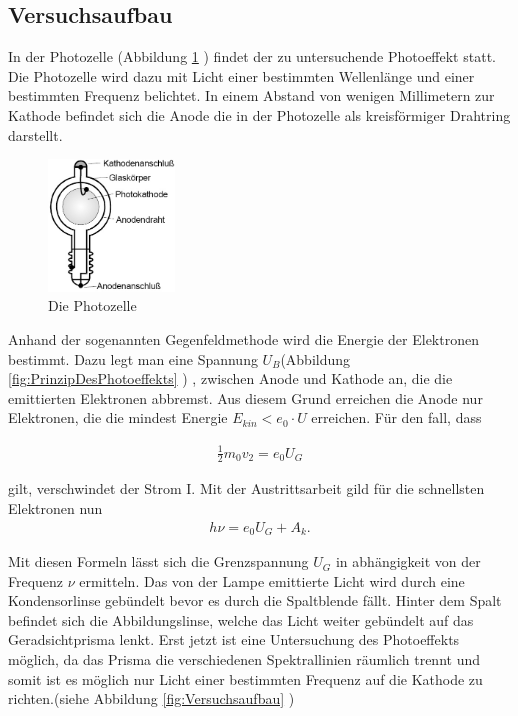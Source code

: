 %
%
\subsection{Versuchsaufbau}
In der Photozelle (Abbildung \ref{fig:Photozelle} ) findet der zu untersuchende Photoeffekt statt.
Die Photozelle wird dazu mit Licht einer bestimmten Wellenlänge und einer bestimmten
Frequenz belichtet. In einem Abstand von wenigen Millimetern zur Kathode befindet sich die Anode die in der Photozelle als kreisförmiger Drahtring darstellt.

\begin{figure}[h]
	\centering
		\includegraphics[width=0.30\textwidth]{Photozelle.jpg}
		\caption{Die Photozelle}
	\label{fig:Photozelle}
\end{figure}

Anhand der sogenannten Gegenfeldmethode wird die Energie der Elektronen bestimmt. Dazu
legt man eine Spannung $U_B$(Abbildung \ref{fig:PrinzipDesPhotoeffekts} ) , zwischen Anode und Kathode an, die
die emittierten Elektronen abbremst. Aus diesem Grund erreichen die Anode nur Elektronen, die die mindest Energie $E_{kin} < e_0 \cdot U$ erreichen.
Für den fall, dass

\begin{align}
\frac{1}{2} m_0 v_2 = e_0  U_G
\end{align}

gilt, verschwindet der Strom I.
Mit der Austrittsarbeit gild für die schnellsten Elektronen nun
\begin{align}
h  \nu = e_0  U_G + A_k.
\end{align}

Mit diesen Formeln lässt sich die Grenzspannung $U_G$ in abhängigkeit von der Frequenz $\nu$ ermitteln.
Das von der Lampe emittierte Licht wird durch eine Kondensorlinse gebündelt bevor es durch die Spaltblende fällt.
Hinter dem Spalt befindet sich die Abbildungslinse, welche das Licht weiter gebündelt auf das Geradsichtprisma
lenkt. Erst jetzt ist eine Untersuchung des Photoeffekts möglich, da das Prisma
die verschiedenen Spektrallinien räumlich trennt und somit ist es möglich nur Licht einer
bestimmten Frequenz auf die Kathode zu richten.(siehe Abbildung \ref{fig:Versuchsaufbau} )

